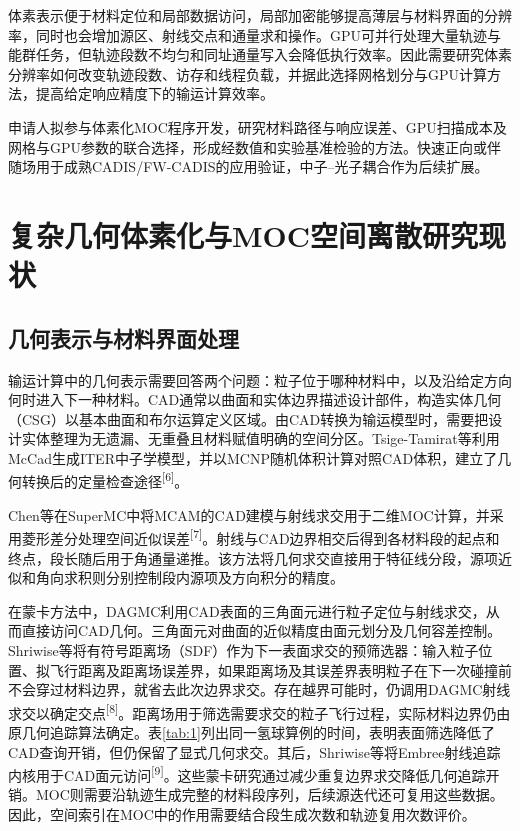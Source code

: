 \documentclass[UTF8, zihao=-4, fontset=none, a4paper]{ctexart}
\newcommand{\upcite}[1]{\textsuperscript{[#1]}}
\begin{document}
体素表示便于材料定位和局部数据访问，局部加密能够提高薄层与材料界面的分辨率，同时也会增加源区、射线交点和通量求和操作。GPU可并行处理大量轨迹与能群任务，但轨迹段数不均匀和同址通量写入会降低执行效率。因此需要研究体素分辨率如何改变轨迹段数、访存和线程负载，并据此选择网格划分与GPU计算方法，提高给定响应精度下的输运计算效率。

申请人拟参与体素化MOC程序开发，研究材料路径与响应误差、GPU扫描成本及网格与GPU参数的联合选择，形成经数值和实验基准检验的方法。快速正向或伴随场用于成熟CADIS/FW-CADIS的应用验证，中子--光子耦合作为后续扩展。

\section{复杂几何体素化与MOC空间离散研究现状}\label{sec:2}

\subsection{几何表示与材料界面处理}

输运计算中的几何表示需要回答两个问题：粒子位于哪种材料中，以及沿给定方向何时进入下一种材料。CAD通常以曲面和实体边界描述设计部件，构造实体几何（CSG）以基本曲面和布尔运算定义区域。由CAD转换为输运模型时，需要把设计实体整理为无遗漏、无重叠且材料赋值明确的空间分区。Tsige-Tamirat等利用McCad生成ITER中子学模型，并以MCNP随机体积计算对照CAD体积，建立了几何转换后的定量检查途径\upcite{6}。

Chen等在SuperMC中将MCAM的CAD建模与射线求交用于二维MOC计算，并采用菱形差分处理空间近似误差\upcite{7}。射线与CAD边界相交后得到各材料段的起点和终点，段长随后用于角通量递推。该方法将几何求交直接用于特征线分段，源项近似和角向求积则分别控制段内源项及方向积分的精度。

在蒙卡方法中，DAGMC利用CAD表面的三角面元进行粒子定位与射线求交，从而直接访问CAD几何。三角面元对曲面的近似精度由面元划分及几何容差控制。Shriwise等将有符号距离场（SDF）作为下一表面求交的预筛选器：输入粒子位置、拟飞行距离及距离场误差界，如果距离场及其误差界表明粒子在下一次碰撞前不会穿过材料边界，就省去此次边界求交。存在越界可能时，仍调用DAGMC射线求交以确定交点\upcite{8}。距离场用于筛选需要求交的粒子飞行过程，实际材料边界仍由原几何追踪算法确定。表\ref{tab:1}列出同一氢球算例的时间，表明表面筛选降低了CAD查询开销，但仍保留了显式几何求交。其后，Shriwise等将Embree射线追踪内核用于CAD面元访问\upcite{9}。这些蒙卡研究通过减少重复边界求交降低几何追踪开销。MOC则需要沿轨迹生成完整的材料段序列，后续源迭代还可复用这些数据。因此，空间索引在MOC中的作用需要结合段生成次数和轨迹复用次数评价。
\end{document}
